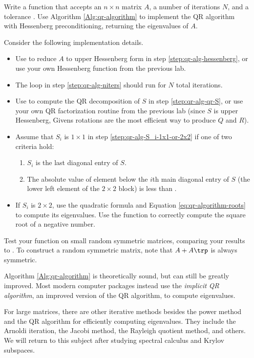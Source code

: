 \begin{problem}
Write a function that accepts an $n \times n$ matrix $A$, a number of iterations $N$, and a tolerance .
Use Algorithm \ref{Alg:qr-algorithm} to implement the QR algorithm with Hessenberg preconditioning, returning the eigenvalues of $A$.

Consider the following implementation details.
\begin{itemize}
    \item Use  to reduce $A$ to upper Hessenberg form in step \ref{step:qr-alg-hessenberg}, or use your own Hessenberg function from the previous lab.
    \item The loop in step \ref{step:qr-alg-niters} should run for $N$ total iterations.
    \item Use  to compute the QR decomposition of $S$ in step \ref{step:qr-alg-qr-S}, or use your own QR factorization routine from the previous lab (since $S$ is upper Hessenberg, Givens rotations are the most efficient way to produce $Q$ and $R$).
    \item Assume that $S_i$ is $1 \times 1$ in step \ref{step:qr-alg-S_i-1x1-or-2x2} if one of two criteria hold:
    \begin{enumerate}
        \item $S_i$ is the last diagonal entry of $S$.
        \item The absolute value of element below the $i$th main diagonal entry of $S$ (the lower left element of the $2\times 2$ block) is less than .
    \end{enumerate}
    \item If $S_i$ is $2 \times 2$, use the quadratic formula and Equation \ref{eq:qr-algorithm-roots} to compute its eigenvalues.
    Use the function  to correctly compute the square root of a negative number.
\end{itemize}

Test your function on small random symmetric matrices, comparing your results to .
To construct a random symmetric matrix, note that $A + A\trp$ is always symmetric.
\end{problem}

\begin{info}
Algorithm \ref{Alg:qr-algorithm} is theoretically sound, but can still be greatly improved.
Most modern computer packages instead use the \emph{implicit QR algorithm}, an improved version of the QR algorithm, to compute eigenvalues.

For large matrices, there are other iterative methods besides the power method and the QR algorithm for efficiently computing eigenvalues.
They include the Arnoldi iteration, the Jacobi method, the Rayleigh quotient method, and others.
We will return to this subject after studying spectral calculus and Krylov subspaces.
\end{info}

